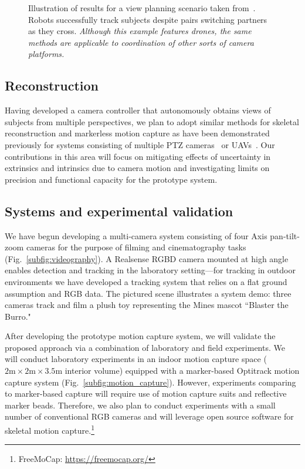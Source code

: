 \documentclass[11pt]{article}
\begin{document}
\begin{figure}
\centering
\setlength{\tabcolsep}{1pt}
\setlength{\figureheight}{1.2in}
      \resizebox{\linewidth}{!}{
      
      }
      \caption{%
        Illustration of results for a view planning scenario taken
        from~\citep{hughes2024cdc}.
        Robots successfully track subjects despite pairs switching partners as
        they cross.
        \emph{Although this example features drones, the same methods are
        applicable to coordination of other sorts of camera platforms.}
      }%
      \label{fig:multi-robot-videography}
\end{figure}

\subsection{Reconstruction}

Having developed a camera controller that autonomously obtains views of subjects
from multiple perspectives, we plan to adopt similar methods for skeletal
reconstruction and markerless motion capture as have been demonstrated
previously for systems consisting of multiple PTZ
cameras~\citep{bachmann20193dv} or
UAVs~\citep{saini2019iccv,ho2021iros,hong2024eccv,saini2022ral}.
Our contributions in this area will focus on mitigating effects of uncertainty
in extrinsics and intrinsics due to camera motion and investigating limits on
precision and functional capacity for the prototype system.

\subsection{Systems and experimental validation}

We have begun developing a multi-camera system consisting of four Axis
pan-tilt-zoom cameras for the purpose of filming and cinematography tasks
(Fig.~\ref{subfig:videography}).
A Realsense RGBD camera mounted at high angle enables detection and tracking
in the laboratory setting---for tracking in outdoor environments we have
developed a tracking system that relies on a flat ground assumption and RGB
data.
The pictured scene illustrates a system demo: three cameras track and film a
plush toy representing the Mines mascot ``Blaster the Burro."

After developing the prototype motion capture system, we will validate the
proposed approach via a combination of laboratory and field experiments.
We will conduct laboratory experiments in an indoor motion capture space
($2\mathrm{m} \times 2\mathrm{m} \times 3.5\mathrm{m}$ interior volume)
equipped with a marker-based Optitrack motion capture system
(Fig.~\ref{subfig:motion_capture}).
However, experiments comparing to marker-based capture will require use of
motion capture suits and reflective marker beads.
Therefore, we also plan to conduct experiments with a small number of
conventional RGB cameras and will leverage open source software for skeletal
motion capture.\footnote{%
  FreeMoCap: \url{https://freemocap.org/}
}
\end{document}

